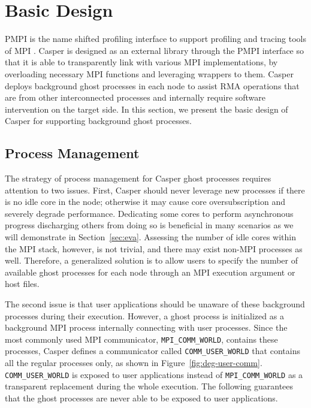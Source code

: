 \section{Basic Design}\label{sec:design}

PMPI is the name shifted profiling interface to support profiling
and tracing tools of MPI \cite{mpi30-report}. Casper is designed
as an external library through the PMPI interface so that it is able
to transparently link with various MPI implementations, by
overloading necessary MPI functions and leveraging wrappers to them.
Casper deploys background ghost processes in each node to assist
RMA operations that are from other interconnected processes and
internally require software intervention on the target side. In this
section, we present the basic design of Casper for supporting
background ghost processes.


\subsection{Process Management}\label{sec:des-pe}

The strategy of process management for Casper ghost processes
requires attention to two issues. First, Casper should never
leverage new processes if there is no idle core in the node;
otherwise it may cause core oversubscription and severely degrade
performance. Dedicating some cores to perform asynchronous progress
discharging others from doing so is beneficial in many scenarios as we
will demonstrate in Section~\ref{sec:eva}. Assessing the number of idle cores within the MPI stack,
however, is not trivial, and there may exist non-MPI processes as
well. Therefore, a generalized solution is to allow users to specify
the number of available ghost processes for each node through an
MPI execution argument or host files.

The second issue is that user applications should be unaware
of these background processes during their execution. However,
a ghost process is initialized as a background MPI process
internally connecting with user processes. Since the most
commonly used MPI communicator, \texttt{MPI\_COMM\_\-WORLD},
contains these processes, Casper defines a communicator called
\texttt{COMM\_\-USER\_WORLD} that contains all the regular
processes only, as shown in Figure~\ref{fig:deg-user-comm}.
\texttt{COMM\_USER\_WORLD} is exposed to user applications instead of
\texttt{MPI\_COMM\_WORLD} as a transparent replacement during the
whole execution. The following guarantees that the ghost
processes are never able to be exposed to user applications.


